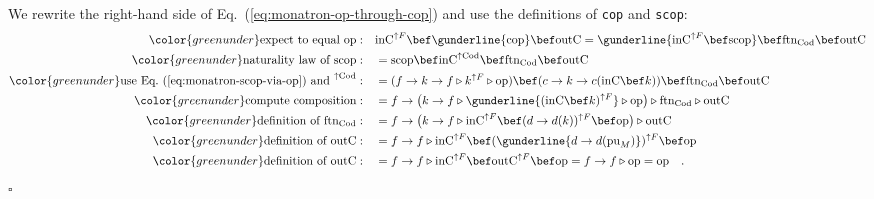 We rewrite the right-hand side of Eq.~(\ref{eq:monatron-op-through-cop})
and use the definitions of \lstinline!cop! and \lstinline!scop!:
\begin{align*}
{\color{greenunder}\text{expect to equal }\text{op}:}\quad & \text{inC}^{\uparrow F}\bef\gunderline{\text{cop}}\bef\text{outC}=\gunderline{\text{inC}^{\uparrow F}\bef\text{scop}}\bef\text{ftn}_{\text{Cod}}\bef\text{outC}\\
{\color{greenunder}\text{naturality law of }\text{scop}:}\quad & =\text{scop}\bef\text{inC}^{\uparrow\text{Cod}}\bef\text{ftn}_{\text{Cod}}\bef\text{outC}\\
{\color{greenunder}\text{use Eq.~(\ref{eq:monatron-scop-via-op}) and }^{\uparrow\text{Cod}}:}\quad & =(f\rightarrow k\rightarrow f\triangleright k^{\uparrow F}\triangleright\text{op})\bef(c\rightarrow k\rightarrow c(\text{inC}\bef k))\bef\text{ftn}_{\text{Cod}}\bef\text{outC}\\
{\color{greenunder}\text{compute composition}:}\quad & =f\rightarrow\big(k\rightarrow f\triangleright\gunderline{(\text{inC}\bef k)^{\uparrow F}}\triangleright\text{op}\big)\triangleright\text{ftn}_{\text{Cod}}\triangleright\text{outC}\\
{\color{greenunder}\text{definition of }\text{ftn}_{\text{Cod}}:}\quad & =f\rightarrow\big(k\rightarrow f\triangleright\text{inC}^{\uparrow F}\bef(d\rightarrow d(k))^{\uparrow F}\bef\text{op}\big)\triangleright\text{outC}\\
{\color{greenunder}\text{definition of }\text{outC}:}\quad & =f\rightarrow f\triangleright\text{inC}^{\uparrow F}\bef(\gunderline{d\rightarrow d(\text{pu}_{M})})^{\uparrow F}\bef\text{op}\\
{\color{greenunder}\text{definition of }\text{outC}:}\quad & =f\rightarrow f\triangleright\text{inC}^{\uparrow F}\bef\text{outC}^{\uparrow F}\bef\text{op}=f\rightarrow f\triangleright\text{op}=\text{op}\quad.
\end{align*}
$\square$

